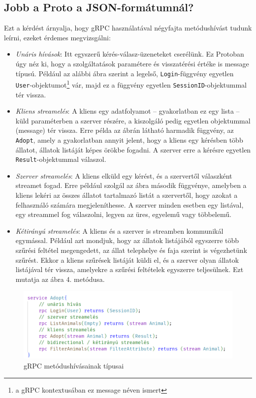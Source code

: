 \documentclass[tocnopagenum]{thesis-ekf}
\begin{document}
	\subsection{Jobb a Proto a JSON-formátumnál?}
	Ezt a kérdést árnyalja, hogy gRPC használatával négyfajta metódushívást tudunk leírni, ezeket érdemes megvizsgálni:
	\begin{itemize}
		\item \textit{Unáris hívások}: Itt egyszerű kérés-válasz-üzeneteket cserélünk. Ez Protoban úgy néz ki, hogy a szolgáltatások paramétere és visszatérési értéke is message típusú. Például az alábbi ábra szerint a legelső, \verb*|Login|-függvény egyetlen \verb*|User|-objektumot\footnote{a gRPC kontextusában ez message néven ismert} vár, majd ez a függvény egyetlen \verb*|SessionID|-objektummal tér vissza.
		\item \textit{Kliens streamelés}: A kliens egy adatfolyamot -- gyakorlatban ez egy lista -- küld paraméterben a szerver részére, a kiszolgáló pedig egyetlen objektummal (message) tér vissza. Erre példa az ábrán látható harmadik függvény, az \verb*|Adopt|, amely a gyakorlatban annyit jelent, hogy a kliens egy kérésben több állatot, állatok listáját képes örökbe fogadni. A szerver erre a kérésre egyetlen \verb*|Result|-objektummal válaszol.
		\item \textit{Szerver streamelés}: A kliens elküld egy kérést, és a szervertől válaszként streamet fogad. Erre például szolgál az ábra második függvénye, amelyben a kliens lekéri az összes állatot tartalmazó listát a szervertől, hogy azokat a felhasználó számára megjeleníthesse. A szerver minden esetben egy listával, egy streammel fog válaszolni, legyen az üres, egyelemű vagy többelemű.
		\item \textit{Kétirányú streamelés}: A kliens és a szerver is streamben kommunikál egymással. Például azt mondjuk, hogy az állatok listájából egyszerre több szűrési feltétel megengedett, az állat telephelye és faja szerint is végezhetünk szűrést. Ekkor a kliens szűrések listáját küldi el, és a szerver olyan állatok listájával tér vissza, amelyekre a szűrési feltételek egyszerre teljesülnek. Ezt mutatja az ábra 4. metódusa.
	\end{itemize}
	\begin{figure}[H]
		\centering
		\includegraphics[scale=0.75]{grpc_calls}
		\caption{gRPC metódushívásainak típusai}
		\label{fig:grpc_calls}
	\end{figure}
\end{document}
